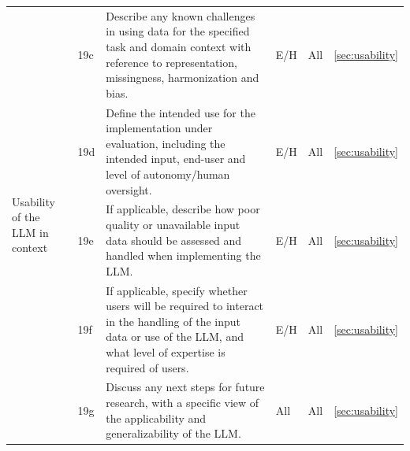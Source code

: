\documentclass{article}
\begin{document}
\begin{longtable}{p{} l p{} l p{} l }
    \multirow{5}{4em}{Usability of the LLM in context} & 19c & Describe any known challenges in using data for the specified task and domain context with reference to representation, missingness, harmonization and bias. & E/H & All & \ref{sec:usability} \\
    & 19d & Define the intended use for the implementation under evaluation, including the intended input, end-user and level of autonomy/human oversight. & E/H & All & \ref{sec:usability} \\
    & 19e & If applicable, describe how poor quality or unavailable input data should be assessed and handled when implementing the LLM. & E/H & All & \ref{sec:usability} \\
    & 19f & If applicable, specify whether users will be required to interact in the handling of the input data or use of the LLM, and what level of expertise is required of users. & E/H & All & \ref{sec:usability} \\
    & 19g & Discuss any next steps for future research, with a specific view of the applicability and generalizability of the LLM. & All & All & \ref{sec:usability} \\
         
\end{longtable}
\end{document}
